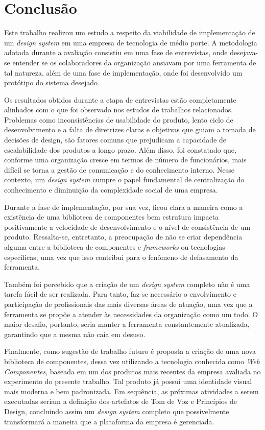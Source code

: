 
\chapter{Conclusão}
\label{chap:conclusao}

Este trabalho realizou um estudo a respeito da viabilidade de implementação de um \textit{design system} em uma empresa de tecnologia de médio porte. A metodologia adotada durante a avaliação consistiu em uma fase de entrevistas, onde desejava-se entender se os colaboradores da organização ansiavam por uma ferramenta de tal natureza, além de uma fase de implementação, onde foi desenvolvido um protótipo do sistema desejado.

Os resultados obtidos durante a etapa de entrevistas estão completamente alinhados com o que foi observado nos estudos de trabalhos relacionados. Problemas como inconsistências de usabilidade do produto, lento ciclo de desenvolvimento e a falta de diretrizes claras e objetivas que guiam a tomada de decisões de design, são fatores comuns que prejudicam a capacidade de escalabilidade dos produtos a longo prazo. Além disso, foi constatado que, conforme uma organização cresce em termos de número de funcionários, mais difícil se torna a gestão de comunicação e do conhecimento interno. Nesse contexto, um \textit{design system} cumpre o papel fundamental de centralização do conhecimento e diminuição da complexidade social de uma empresa.

Durante a fase de implementação, por sua vez, ficou clara a maneira como a existência de uma biblioteca de componentes bem estrutura impacta positivamente a velocidade de desenvolvimento e o nível de consistência de um produto. Ressalta-se, entretanto, a preocupação de não se criar dependência alguma entre a biblioteca de componentes e \textit{frameworks} ou tecnologias específicas, uma vez que isso contribui para o fenômeno de defasamento da ferramenta.

Também foi percebido que a criação de um \textit{design system} completo não é uma tarefa fácil de ser realizada. Para tanto, faz-se necessário o envolvimento e participação de profissionais das mais diversas áreas de atuação, uma vez que a ferramenta se propõe a atender às necessidades da organização como um todo. O maior desafio, portanto, seria manter a ferramenta constantemente atualizada, garantindo que a mesma não caia em desuso.

Finalmente, como sugestão de trabalho futuro é proposta a criação de uma nova biblioteca de componentes, dessa vez utilizando a tecnologia conhecida como \textit{Web Componentes}, baseada em um dos produtos mais recentes da empresa avaliada no experimento do presente trabalho. Tal produto já possui uma identidade visual mais moderna e bem padronizada. Em sequência, as próximas atividades a serem executadas seriam a definição dos artefatos de Tom de Voz e Princípios de Design, concluindo assim um \textit{design system} completo que possivelmente transformará a maneira que a plataforma da empresa é gerenciada.
